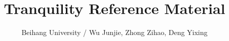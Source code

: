 \documentclass[a4paper]{article}
\begin{document}
\title{\Huge \bf Tranquility Reference Material}
\author{Beihang University / Wu Junjie, Zhong Zihao, Deng Yixing}

\maketitle

\begin{multicols*}{2}
\tableofcontents
\end{multicols*}

\clearpage

\columnseprule=0pt
\fontsize{7pt}{9pt}
\selectfont

\setcounter{page}{1}
\begin{multicols*}{2}

\end{multicols*}
\end{document}
